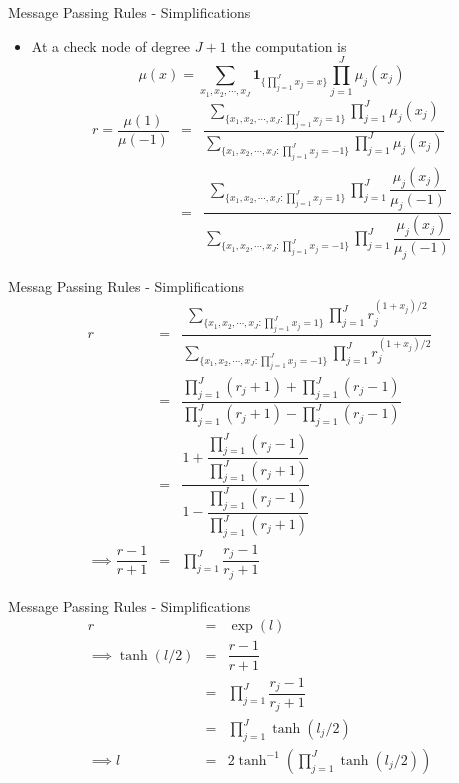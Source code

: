 \documentclass{beamer}
\begin{document}
 \begin{frame}{Message Passing Rules - Simplifications}
 \begin{itemize} \itemsep 0.2cm
  \item At a check node of degree $J + 1$ the computation is
  \begin{equation}
   \mu(x) = \sum_{x_1, x_2, \cdots, x_J} \mathbf{1}_{\lbrace \prod_{j = 1}^J x_j = x\rbrace} \prod_{j = 1}^J \mu_j(x_j)
  \end{equation}
  \begin{eqnarray}
   r = \dfrac{\mu(1)}{\mu(-1)} &=& \dfrac{\sum_{\lbrace x_1, x_2, \cdots, x_J : \prod_{j = 1}^J x_j = 1\rbrace} \prod_{j = 1}^J \mu_j(x_j)}{\sum_{\lbrace x_1, x_2, \cdots, x_J : \prod_{j = 1}^J x_j = -1 \rbrace} \prod_{j = 1}^J \mu_j(x_j)} \\
   &=& \dfrac{\sum_{\lbrace x_1, x_2, \cdots, x_J : \prod_{j = 1}^J x_j = 1\rbrace} \prod_{j = 1}^J \dfrac{\mu_j(x_j)}{\mu_j(-1)}}{\sum_{\lbrace x_1, x_2, \cdots, x_J : \prod_{j = 1}^J x_j = -1\rbrace} \prod_{j = 1}^J \dfrac{\mu_j(x_j)}{\mu_j(-1)}}
  \end{eqnarray}

 
 \end{itemize}
 
 \end{frame}
 \begin{frame}{Messag Passing Rules - Simplifications}
    \begin{eqnarray}
   r &=& \dfrac{\sum_{\lbrace x_1, x_2, \cdots, x_J : \prod_{j = 1}^J x_j = 1 \rbrace} \prod_{j = 1}^J r_j^{(1 + x_j)/2}}{\sum_{\lbrace x_1, x_2, \cdots, x_J : \prod_{j = 1}^J x_j = -1\rbrace} \prod_{j = 1}^J r_j^{(1 + x_j)/2}} \\
   &=& \dfrac{\prod_{j = 1}^J (r_j + 1) + \prod_{j = 1}^J (r_j - 1)}{\prod_{j = 1}^J (r_j + 1) - \prod_{j = 1}^J (r_j - 1)} \\
   &=& \dfrac{1 + \dfrac{\prod_{j = 1}^J (r_j - 1)}{\prod_{j = 1}^J (r_j + 1)}}{1 - \dfrac{\prod_{j = 1}^J (r_j - 1)}{\prod_{j = 1}^J (r_j + 1)}} \\
   \implies \dfrac{r - 1}{r + 1} &=& \prod_{j = 1}^{J} \dfrac{r_j - 1}{r_j + 1}
  \end{eqnarray}
 \end{frame}

 \begin{frame}{Message Passing Rules - Simplifications}
  \begin{eqnarray}
   r &=& \exp (l) \\
   \implies \tanh(l/2) &=& \dfrac{r - 1}{r + 1} \\
   &=& \prod_{j = 1}^{J} \dfrac{r_j - 1}{r_j + 1} \\
   &=& \prod_{j = 1}^{J} \tanh(l_j/2) \\
   \implies l &=& 2\tanh^{-1} \left( \prod_{j = 1}^{J} \tanh(l_j/2) \right)
  \end{eqnarray}
 \end{frame}
 
\end{document}
